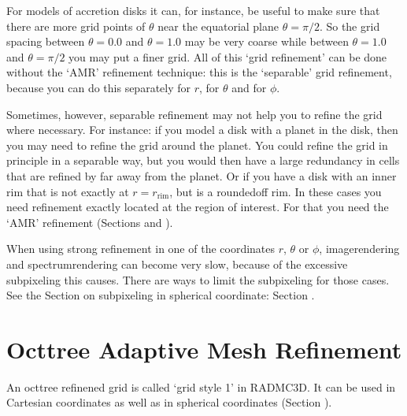 \documentclass[letterpaper,10pt,english]{sphinxmanual}
\begin{document}
For models of accretion disks it can, for instance, be useful to make sure that
there are more grid points of \(\theta\) near the equatorial plane
\(\theta=\pi/2\). So the grid spacing between \(\theta=0.0\) and
\(\theta=1.0\) may be very coarse while between \(\theta=1.0\) and
\(\theta=\pi/2\) you may put a finer grid. All of this ‘grid refinement’ can
be done without the ‘AMR’ refinement technique: this is the ‘separable’ grid
refinement, because you can do this separately for \(r\), for \(\theta\)
and for \(\phi\).

Sometimes, however, separable refinement may not help you to refine the grid
where necessary. For instance: if you model a disk with a planet in the
disk, then you may need to refine the grid around the planet. You could
refine the grid in principle in a separable way, but you would then have a
large redundancy in cells that are refined by far away from the planet.  Or
if you have a disk with an inner rim that is not exactly at
\(r=r_{\mathrm{rim}}\), but is a rounded\sphinxhyphen{}off rim. In these cases you need
refinement exactly located at the region of interest. For that you need the
‘AMR’ refinement (Sections {\hyperref[\detokenize{gridding:sec-oct-tree-amr}]{}} and {\hyperref[\detokenize{gridding:sec-layered-amr}]{}}).

 When using strong refinement in one of the coordinates
\(r\), \(\theta\) or \(\phi\), image\sphinxhyphen{}rendering and
spectrum\sphinxhyphen{}rendering can become very slow, because of the excessive sub\sphinxhyphen{}pixeling
this causes. There are ways to limit the sub\sphinxhyphen{}pixeling for those cases. See the
Section on sub\sphinxhyphen{}pixeling in spherical coordinate: Section
{\hyperref[\detokenize{imagesspectra:sec-rec-subpixel-spher-coord}]{}}.


\section{Oct\sphinxhyphen{}tree Adaptive Mesh Refinement}
\label{\detokenize{gridding:oct-tree-adaptive-mesh-refinement}}\label{\detokenize{gridding:sec-oct-tree-amr}}
An oct\sphinxhyphen{}tree refinened grid is called ‘grid style 1’ in RADMC\sphinxhyphen{}3D. It can be
used in Cartesian coordinates as well as in spherical coordinates (Section
{\hyperref[\detokenize{basicstructure:sec-coord-systems}]{}}).
\end{document}
